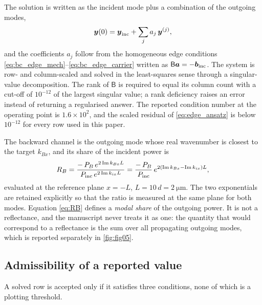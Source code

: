 The solution is written as the incident mode plus a combination of the outgoing
modes,
\begin{equation}
\label{eq:edge_ansatz}
\boldsymbol{y}(0)=\boldsymbol{y}_{\text{inc}}+\sum_{j}a_j\,\boldsymbol{y}^{(j)},
\end{equation}
and the coefficients $a_j$ follow from the homogeneous edge conditions
\eqref{eq:bc_edge_mech}--\eqref{eq:bc_edge_carrier} written as
$\mathsf{B}\boldsymbol{a}=-\boldsymbol{b}_{\text{inc}}$.  The system is row- and
column-scaled and solved in the least-squares sense through a singular-value
decomposition.  The rank of $\mathsf{B}$ is required to equal its column count
with a cut-off of $10^{-12}$ of the largest singular value; a rank deficiency
raises an error instead of returning a regularised answer.  The reported
condition number at the operating point is $1.6\times10^{2}$, and the scaled
residual of \eqref{eq:edge_ansatz} is below $10^{-12}$ for every row used in
this paper.

The backward channel is the outgoing mode whose real wavenumber is closest to
the target $k_{Bx}$, and its share of the incident power is
\begin{equation}
\label{eq:RB}
R_B=\frac{-\,P_{B}\,e^{2\operatorname{Im} k_{Bx}L}}{P_{\text{inc}}\,e^{2\operatorname{Im} k_{ix}L}}
=\frac{-\,P_{B}}{P_{\text{inc}}}\,e^{2(\operatorname{Im} k_{Bx}-\operatorname{Im} k_{ix})L},
\end{equation}
evaluated at the reference plane $x=-L$, $L=10\,d=\SI{2}{\micro\metre}$.  The
two exponentials are retained explicitly so that the ratio is measured at the
same plane for both modes.  Equation \eqref{eq:RB} defines a \emph{modal share}
of the outgoing power.  It is not a reflectance, and the manuscript never
treats it as one: the quantity that would correspond to a reflectance is the
sum over all propagating outgoing modes, which is reported separately in
\cref{fig:fig05}.

\subsection{Admissibility of a reported value}
\label{sec:numerics_admissibility}

A solved row is accepted only if it satisfies three conditions, none of which
is a plotting threshold.

